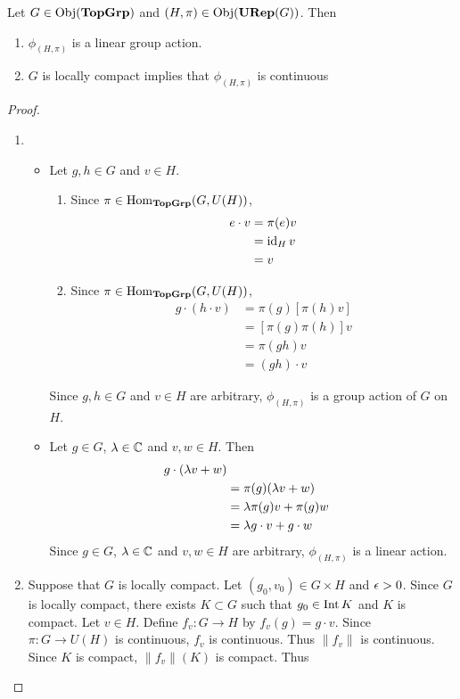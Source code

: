 \documentclass{book}
\begin{document}
	\begin{ex}
		Let $G \in \operatorname{Obj}(\operatorname*{\text{\textbf{TopGrp}}})$ and $(H, \pi) \in \operatorname{Obj}(\operatorname*{\text{\textbf{URep}}}(G))$. Then 
		\begin{enumerate}
			\item $\phi_{(H, \pi)}$ is a linear group action. 
			\item $G$ is locally compact implies that $\phi_{(H, \pi)}$ is continuous
		\end{enumerate}
	\end{ex}
	
	\begin{proof}\
		\begin{enumerate}
			\item 
			\begin{itemize}
				\item Let $g,h \in G$ and $v \in H$. 
				\begin{enumerate}
					\item Since $\pi \in \operatorname{Hom}_{\operatorname*{\text{\textbf{TopGrp}}}}(G, U(H))$, 
					\begin{align*}
						e \cdot v
						& = \pi(e)v \\
						& = \operatorname{id}_H v \\
						& = v
					\end{align*}
					\item Since $\pi \in \operatorname{Hom}_{\operatorname*{\text{\textbf{TopGrp}}}}(G, U(H))$, 
					\begin{align*}
						g \cdot (h \cdot v) 
						& = \pi(g)[\pi(h) v] \\
						& = [\pi(g) \pi(h)] v \\
						& = \pi(gh) v \\
						& = (gh) \cdot v
					\end{align*}
				\end{enumerate}
				Since $g,h \in G$ and $v \in H$ are arbitrary, $\phi_{(H, \pi)}$ is a group action of $G$ on $H$.
				\item Let $g \in G$, $\lambda \in \mathbb{C}$ and $v,w \in H$. Then 
				\begin{align*}
					g \cdot (\lambda v + w) \\
					& = \pi(g)(\lambda v + w) \\
					& = \lambda \pi(g) v + \pi(g) w \\
					& = \lambda g \cdot v + g \cdot w
				\end{align*} 
				Since $g \in G$, $\lambda \in \mathbb{C}$ and $v,w \in H$ are arbitrary, $\phi_{(H, \pi)}$ is a linear action.
			\end{itemize}
			\item Suppose that $G$ is locally compact. Let $(g_0, v_0) \in G \times H$ and $\epsilon > 0$. Since $G$ is locally compact, there exists $K \subset G$ such that $g_0 \in \operatorname{Int} K$ and $K$ is compact. Let $v \in H$. Define $f_v:G \rightarrow H$ by $f_v(g) = g \cdot v$. Since $\pi: G \rightarrow U(H)$ is continuous, $f_v$ is continuous. Thus $\|f_v\|$ is continuous. Since $K$ is compact, $\|f_v\|(K)$ is compact. Thus 

\end{enumerate}
\end{proof}
\end{document}
